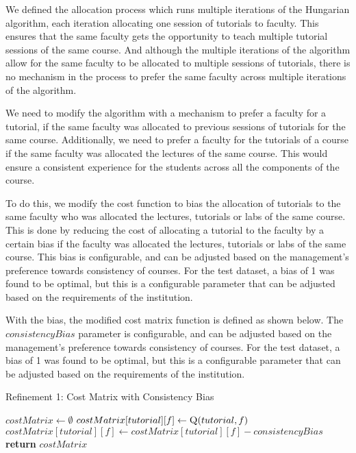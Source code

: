 We defined the allocation process which runs multiple iterations of the Hungarian algorithm, each iteration allocating one session of tutorials to faculty. This ensures that the same faculty gets the opportunity to teach multiple tutorial sessions of the same course. And although the multiple iterations of the algorithm allow for the same faculty to be allocated to multiple sessions of tutorials, there is no mechanism in the process to prefer the same faculty across multiple iterations of the algorithm.

We need to modify the algorithm with a mechanism to prefer a faculty for a tutorial, if the same faculty was allocated to previous sessions of tutorials for the same course. Additionally, we need to prefer a faculty for the tutorials of a course if the same faculty was allocated the lectures of the same course. This would ensure a consistent experience for the students across all the components of the course.

To do this, we modify the cost function to bias the allocation of tutorials to the same faculty who was allocated the lectures, tutorials or labs of the same course. This is done by reducing the cost of allocating a tutorial to the faculty by a certain bias if the faculty was allocated the lectures, tutorials or labs of the same course. This bias is configurable, and can be adjusted based on the management's preference towards consistency of courses. For the test dataset, a bias of 1 was found to be optimal, but this is a configurable parameter that can be adjusted based on the requirements of the institution.

With the bias, the modified cost matrix function is defined as shown below. The $consistencyBias$ parameter is configurable, and can be adjusted based on the management's preference towards consistency of courses. For the test dataset, a bias of 1 was found to be optimal, but this is a configurable parameter that can be adjusted based on the requirements of the institution.

\begin{algorithm}[H]
  \caption*{Refinement 1: Cost Matrix with Consistency Bias}
  \begin{algorithmic}
    \State $costMatrix \gets \emptyset$
    \State $costMatrix[tutorial][f] \gets \Call{Q}{tutorial, f}$
    \State $costMatrix[tutorial][f] \gets costMatrix[tutorial][f] - consistencyBias$
    \EndIf
    \EndFor
    \EndFor
    \State \textbf{return} $costMatrix$
    \EndProcedure
  \end{algorithmic}
\end{algorithm}

